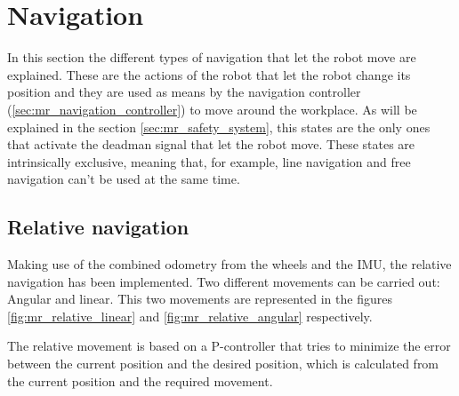 \section{Navigation} %
\label{sec:mr_navigation}
In this section the different types of navigation that let the robot move are explained.
These are the actions of the robot that let the robot change its position and they are used as means by the navigation controller (\ref{sec:mr_navigation_controller}) to move around the workplace.
As will be explained in the section \ref{sec:mr_safety_system}, this states are the only ones that activate the deadman signal that let the robot move.
These states are intrinsically exclusive, meaning that, for example, line navigation and free navigation can't be used at the same time.

    \subsection{Relative navigation} %
    \label{sub:mr_relative_navigation}
    Making use of the combined odometry from the wheels and the IMU, the relative navigation has been implemented.
    Two different movements can be carried out: Angular and linear.
    This two movements are represented in the figures \ref{fig:mr_relative_linear} and \ref{fig:mr_relative_angular} respectively.

    The relative movement is based on a P-controller that tries to minimize the error between the current position and the desired position, which is calculated from the current position and the required movement.

